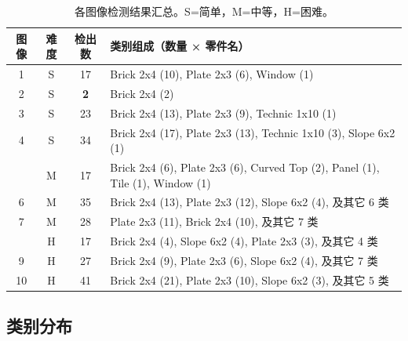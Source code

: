 \documentclass[12pt,a4paper]{ctexart}
\begin{document}
\begin{table}[H]
    \centering
    \caption{各图像检测结果汇总。S=简单，M=中等，H=困难。}
    \label{tab:perimage}
    \small
    \begin{tabular}{cccl}
        \toprule
        \textbf{图像} & \textbf{难度} & \textbf{检出数} & \textbf{类别组成（数量 × 零件名）} \\
        \midrule
        1  & S & 17 & Brick 2x4 (10), Plate 2x3 (6), Window (1) \\
        2  & S & \textbf{2}  & Brick 2x4 (2) \\
        3  & S & 23 & Brick 2x4 (13), Plate 2x3 (9), Technic 1x10 (1) \\
        4  & S & 34 & Brick 2x4 (17), Plate 2x3 (13), Technic 1x10 (3), Slope 6x2 (1) \\
        \addlinespace
        5  & M & 17 & Brick 2x4 (6), Plate 2x3 (6), Curved Top (2), Panel (1), Tile (1), Window (1) \\
        6  & M & 35 & Brick 2x4 (13), Plate 2x3 (12), Slope 6x2 (4), 及其它 6 类 \\
        7  & M & 28 & Plate 2x3 (11), Brick 2x4 (10), 及其它 7 类 \\
        \addlinespace
        8  & H & 17 & Brick 2x4 (4), Slope 6x2 (4), Plate 2x3 (3), 及其它 4 类 \\
        9  & H & 27 & Brick 2x4 (9), Plate 2x3 (6), Slope 6x2 (4), 及其它 7 类 \\
        10 & H & 41 & Brick 2x4 (21), Plate 2x3 (10), Slope 6x2 (3), 及其它 5 类 \\
        \bottomrule
    \end{tabular}
\end{table}

\subsection{类别分布}
\end{document}
